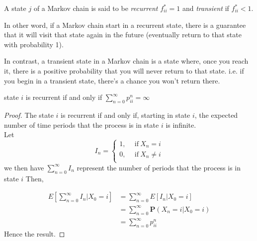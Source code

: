 \begin{definition}
    A state $ j $ of a Markov chain is said to be \textit{recurrent}  $ f^*_{ii}=1 $ and \textit{transient}  if $ f^*_{ii}<1 $.
\end{definition}

In other word, if a Markov chain start in a recurrent state, there is a guarantee that it will visit that state again in the future
(eventually return to that state with probability 1).

In contrast, a transient state in a Markov chain is a state where, once you reach it, 
there is a positive probability that you will never return to that state.
i.e. if you begin in a transient state, there's a chance you won't return there.

\begin{corollary}
    \label{recurrent}
    state $ i $ is recurrent if and only if  $ \sum_{n=0}^{\infty} p^{n}_{ii}=\infty $
\end{corollary}
\begin{proof}
    The state $ i $ is recurrent if and only if, starting in state  $ i $, the expected number of time periods that the 
    process is in state  $ i $ is infinite. \\ 
    Let
    \[
        I_{n} =
        \begin{cases}
            1, \ \ &\text{if}\ X_{n} = i\\ 
            0, \ \ &\text{if}\ X_{n} \neq  i\\ 
        \end{cases}
    \]
    we then have $ \sum_{n=0}^{\infty} I_{n} $ represent the number of periods that the process is in state $ i $ Then,

    \begin{align*}
        E\left[\sum_{n=0}^{\infty} I_{n}|X_{0}=i\right]&= \sum_{n=0}^{\infty} E[I_{n}|X_{0}=i] \\
        &= \sum_{n=0}^{\infty} \mathbf{P}(X_{n}=i|X_{0}=i) \\
        &= \sum_{n=0}^{\infty} p^{n}_{ii} 
    \end{align*}
    Hence the result.
\end{proof}

